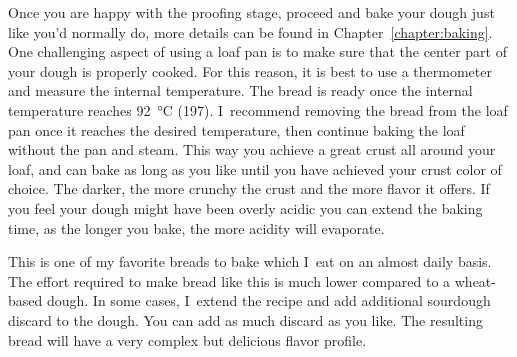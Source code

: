 Once you are happy with the proofing stage, proceed and bake your dough
just like you'd normally do, more details can be found in
Chapter~\ref{chapter:baking}. One challenging aspect
of using a loaf pan is to make sure that the center part of your
dough is properly cooked. For this reason, it is best to use a thermometer
and measure the internal temperature. The bread is ready once the internal
temperature reaches \qty{92}{\degreeCelsius} (\qty{197}{\degF}). I~recommend
removing the bread from the loaf pan once it reaches the desired temperature,
then continue baking the loaf without the pan and steam. This way you achieve
a great crust all around your loaf, and can bake as long as you like until you
have achieved your crust color of choice. The darker, the more crunchy
the crust and the more flavor it offers. If you feel your dough might have
been overly acidic you can extend the baking time, as the longer you bake, the
more acidity will evaporate.

This is one of my favorite breads to bake which I~eat on an
almost daily basis. The effort required to make bread like
this is much lower compared to a wheat-based dough. In some
cases, I~extend the recipe and add additional sourdough discard
to the dough. You can add as much discard as you like. The resulting
bread will have a very complex but delicious flavor profile.

